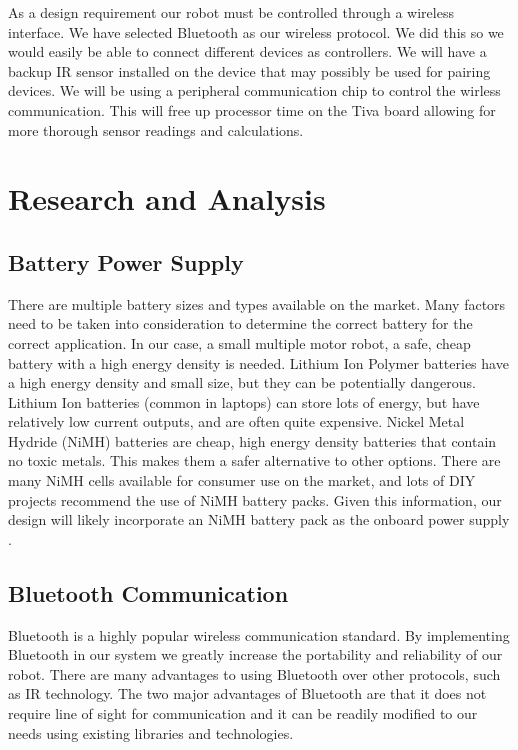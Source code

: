 \documentclass[11pt]{report}
\begin{document}
\begin{spacing}{1.5}
As a design requirement our robot must be controlled through a wireless interface.  We have selected Bluetooth\textsuperscript{\textregistered} as our wireless protocol.  We did this so we would easily be able to connect different devices as controllers.  We will have a backup IR sensor installed on the device that may possibly be used for pairing devices.  We will be using a peripheral communication chip to control the wirless communication.  This will free up processor time on the Tiva board allowing for more thorough sensor readings and calculations.

\section*{Research and Analysis} %

\subsection*{Battery Power Supply}
There are multiple battery sizes and types available on the market. Many factors need to be taken into consideration to determine the correct battery for the correct application. In our case, a small multiple motor robot, a safe, cheap battery with a high energy density is needed. Lithium Ion Polymer batteries have a high energy density and small size, but they can be potentially dangerous. Lithium Ion batteries (common in laptops) can store lots of energy, but have relatively low current outputs, and are often quite expensive. Nickel Metal Hydride (NiMH) batteries are cheap, high energy density batteries that contain no toxic metals. This makes them a safer alternative to other options. There are many NiMH cells available for consumer use on the market, and lots of DIY projects recommend the use of NiMH battery packs. Given this information, our design will likely incorporate an NiMH battery pack as the onboard power supply \cite{Calin}.

\subsection*{Bluetooth Communication}
Bluetooth\textsuperscript{\textregistered} is a highly popular wireless communication standard.  By implementing Bluetooth\textsuperscript{\textregistered} in our system we greatly increase the portability and reliability of our robot.  There are many advantages to using Bluetooth\textsuperscript{\textregistered} over other protocols, such as IR technology.  The two major advantages of Bluetooth\textsuperscript{\textregistered} are that it does not require line of sight for communication and it can be readily modified to our needs using existing libraries and technologies.


\end{spacing}
\end{document}
